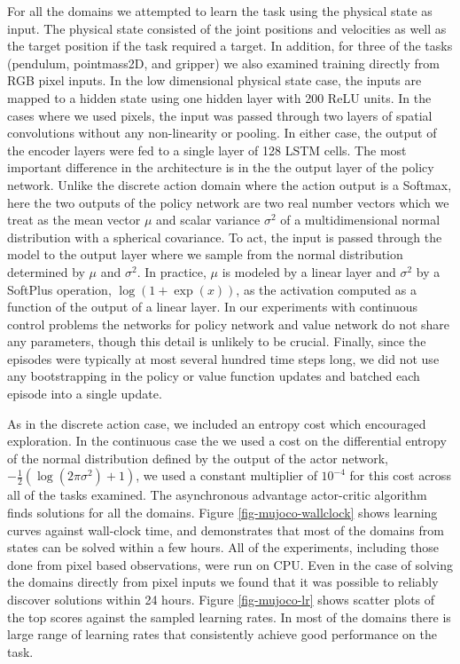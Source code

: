\documentclass{article} \usepackage{times}
\begin{document}
For all the domains we attempted to learn the task using the physical state as input.
The physical state consisted of the joint positions and velocities as well
as the target position if the task required a target.
In addition, for three of the tasks (pendulum, pointmass2D, and gripper) we also examined
training directly from RGB pixel inputs.
In the low dimensional physical state case, the inputs are mapped to a hidden state using one hidden layer with 200 ReLU units.
In the cases where we used pixels, the input was passed through two layers of spatial convolutions without any non-linearity or pooling.
In either case, the output of the encoder layers were fed to a single layer of 128 LSTM cells.
The most important difference in the architecture is in the the output layer of the policy
network. Unlike the discrete action domain where the action output is a Softmax, here the two outputs
of the policy network are two real number vectors which we treat
as the mean vector $\mu$ and scalar variance $\sigma^2$ of a multidimensional normal distribution
with a spherical covariance.
To act, the input is passed through the model to the output layer where we sample from the
normal distribution determined by $\mu$ and $\sigma^2$.
In practice, $\mu$ is modeled by a linear layer and $\sigma^2$ by a SoftPlus operation, $\log (1 + \exp (x))$,
as the activation computed as a function of the output of a linear layer.
In our experiments with continuous control problems the networks for policy network
and value network do not share any parameters, though this detail is unlikely to be crucial.
Finally, since the episodes were typically at most several hundred time steps long, we
did not use any bootstrapping in the policy or value function updates and batched each episode
into a single update.

As in the discrete action case, we included an entropy cost which encouraged exploration.
In the continuous case the we used a cost on the differential entropy of the normal distribution defined by
the output of the actor network, $-\frac{1}{2}(\log(2\pi\sigma^2)+1)$, we used a constant multiplier of $10^{-4}$ for this cost across all of the tasks
examined.
The asynchronous advantage actor-critic algorithm finds solutions for all the domains.  Figure \ref{fig-mujoco-wallclock}
shows learning curves against wall-clock time, and demonstrates that most of the domains from
states can be solved within a few hours. All of the experiments, including those done
from pixel based observations, were run on CPU.  Even in the case of solving the domains
directly from pixel inputs we found that it was possible to reliably discover solutions
within 24 hours.
Figure \ref{fig-mujoco-lr} shows scatter plots of the top scores against the sampled learning rates.
In most of the domains there is large range of learning rates that consistently achieve good performance
on the task.
\end{document}
